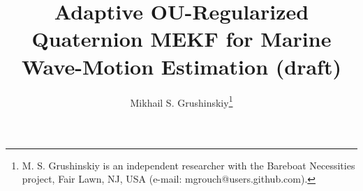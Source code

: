 \documentclass[10pt,journal]{IEEEtran}
\title{Adaptive OU-Regularized Quaternion MEKF for Marine Wave-Motion Estimation (draft)}
\author{Mikhail S. Grushinskiy\thanks{M. S. Grushinskiy is an independent
researcher with the Bareboat Necessities project, Fair Lawn, NJ, USA
(e-mail: mgrouch@users.github.com).}}
\theoremstyle{bodysmall}
\theoremstyle{remark}
\begin{document}
\providecommand{\OURobustnessNominalMean}{--}
\providecommand{\OURobustnessSigmaSpan}{--}
\providecommand{\OURobustnessRSSpan}{--}
\providecommand{\OURobustnessCoupledSigmaSpan}{--}
\providecommand{\OURobustnessCoupledTauSpan}{--}
\providecommand{\OUValidationBootstrapMethod}{a nonparametric percentile bootstrap of the paired mean}
\providecommand{\OUValidationBootstrapResamples}{10{,}000}
\providecommand{\OUValidationBootstrapRNG}{NumPy PCG64}
\providecommand{\OUValidationStatsSeed}{--}
\providecommand{\OUValidationPairedComparisons}{--}
\providecommand{\OUValidationThreeDScenarios}{--}
\providecommand{\OUValidationThreeDHigherCount}{--}
\providecommand{\OUValidationThreeDUnresolvedCount}{--}
\providecommand{\OUValidationNormalizedTLow}{--}
\providecommand{\OUValidationNormalizedTHigh}{--}
\providecommand{\OUValidationNormalizedTStatistic}{--}
\providecommand{\OUValidationNormalizedTP}{--}
\providecommand{\OUValidationNormalizedSignNegative}{--}
\providecommand{\OUValidationNormalizedSignP}{--}
\providecommand{\OUValidationNormalizedRandomizationP}{--}
\providecommand{\OUValidationNormalizedRandomizationPatterns}{--}

\maketitle
\end{document}

